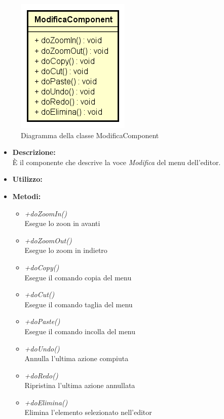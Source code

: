 \begin{figure}[h!]
	\centering
	\includegraphics[scale=0.8]{res/sections/SpecificaFrontEnd/Components/Disegnetti/modifica.png}
	\caption{Diagramma della classe ModificaComponent}
\end{figure}

\begin{itemize}
	\item \textbf{Descrizione:}\\
	È il componente che descrive la voce \textit{Modifica} del menu dell'editor.
	\item \textbf{Utilizzo:}\\
	
	\item \textbf{Metodi:}
		\begin{itemize}
			\item \emph{+doZoomIn()}\\
    		Esegue lo zoon in avanti
    		\item \emph{+doZoomOut()}\\
    		Esegue lo zoom in indietro
    		\item \emph{+doCopy()}\\
    		Esegue il comando copia del menu
    		\item \emph{+doCut()}\\
    		Esegue il comando taglia del menu
    		\item \emph{+doPaste()}\\
    		Esegue il comando incolla del menu
    		\item \emph{+doUndo()}\\
    		Annulla l'ultima azione compiuta
    		\item \emph{+doRedo()}\\
    		Ripristina l'ultima azione annullata
    		\item \emph{+doElimina()}\\
    		Elimina l'elemento selezionato nell'editor	    		
		\end{itemize}
\end{itemize}